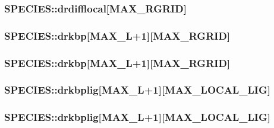 \hypertarget{struct_s_p_e_c_i_e_s_a643bf6e09b2524eea605bbc4680cba67}{
\subsubsection[{drdifflocal}]{ S\-P\-E\-C\-I\-E\-S\-::drdifflocal\mbox{[}{\bf M\-A\-X\-\_\-\-R\-G\-R\-I\-D}\mbox{]}}}\label{struct_s_p_e_c_i_e_s_a643bf6e09b2524eea605bbc4680cba67}
\hypertarget{struct_s_p_e_c_i_e_s_aa24b2f9eeeee7680fb185166de434f26}{
\subsubsection[{drkbp}]{ S\-P\-E\-C\-I\-E\-S\-::drkbp\mbox{[}{\bf M\-A\-X\-\_\-\-L}+1\mbox{]}\mbox{[}{\bf M\-A\-X\-\_\-\-R\-G\-R\-I\-D}\mbox{]}}}\label{struct_s_p_e_c_i_e_s_aa24b2f9eeeee7680fb185166de434f26}
\hypertarget{struct_s_p_e_c_i_e_s_a04cabf270d55cf211e25771ac45547e2}{
\subsubsection[{drkbp}]{ S\-P\-E\-C\-I\-E\-S\-::drkbp\mbox{[}{\bf M\-A\-X\-\_\-\-L}+1\mbox{]}\mbox{[}{\bf M\-A\-X\-\_\-\-R\-G\-R\-I\-D}\mbox{]}}}\label{struct_s_p_e_c_i_e_s_a04cabf270d55cf211e25771ac45547e2}
\hypertarget{struct_s_p_e_c_i_e_s_a5f5747982505f49983d15c0db1ab6c96}{
\subsubsection[{drkbplig}]{ S\-P\-E\-C\-I\-E\-S\-::drkbplig\mbox{[}{\bf M\-A\-X\-\_\-\-L}+1\mbox{]}\mbox{[}{\bf M\-A\-X\-\_\-\-L\-O\-C\-A\-L\-\_\-\-L\-I\-G}\mbox{]}}}\label{struct_s_p_e_c_i_e_s_a5f5747982505f49983d15c0db1ab6c96}
\hypertarget{struct_s_p_e_c_i_e_s_ae0daa033ccfb54f77c912ba69cdf0c05}{
\subsubsection[{drkbplig}]{ S\-P\-E\-C\-I\-E\-S\-::drkbplig\mbox{[}{\bf M\-A\-X\-\_\-\-L}+1\mbox{]}\mbox{[}{\bf M\-A\-X\-\_\-\-L\-O\-C\-A\-L\-\_\-\-L\-I\-G}\mbox{]}}}\label{struct_s_p_e_c_i_e_s_ae0daa033ccfb54f77c912ba69cdf0c05}
